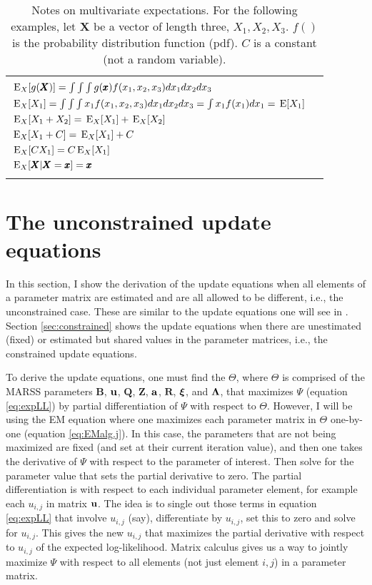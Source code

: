 \documentclass[]{article}
\def\xixi{\mbox{\boldmath $\xi$}}
\def\LAM{\mbox{\boldmath $\Lambda$}}
\def\ZZ{\mbox{$\mathbf Z$}}	\def\zz{\mbox{$\mathbf z$}}
\def\BB{\mbox{$\mathbf B$}}	\def\bb{\mbox{$\mathbf b$}}
\def\QQ{\mbox{$\mathbf Q$}}	 \def\qq{\mbox{$\mathbf q$}}
\def\RR{\mbox{$\mathbf R$}}	 \def\rr{\mbox{$\mathbf r$}}
\def\XX{\mbox{$\pmb{X}$}}	\def\xx{\mbox{$\pmb{x}$}}
\def\E{\,\textup{\textrm{E}}}
\begin{document}
\begin{table}
	\caption{Notes on multivariate expectations.  For the following examples, let $\XX$ be a vector of length three, $X_1,X_2,X_3$. $f()$ is the probability distribution function (pdf). $C$ is a constant (not a random variable).}
	\label{tab:MultivariateExpectations}
\begin{center}\begin{tabular}{lr}
\hline\\
$\E_X[g(\XX)]=\int{\int{\int{g(\xx)f(x_1,x_2,x_3) dx_1 dx_2 dx_3}}}$\\
$\E_X[X_1]=\int{\int{\int{x_1 f(x_1,x_2,x_3) dx_1 dx_2 dx_3}}}=\int{x_1 f(x_1) dx_1}=\E[X_1]$ \\
$\E_X[X_1+X_2]=\E_X[X_1]+\E_X[X_2]$\\
$\E_X[X_1+C]=\E_X[X_1]+C$\\
$\E_X[C X_1]=C\E_X[X_1]$\\
$\E_X[\XX|\XX=\xx]=\xx$ \\
\\
\hline
\end{tabular}
\end{center}
\end{table}

\section{The unconstrained update equations}\label{sec:generalupdate}
In this section, I show the derivation of the update equations when all elements of a parameter matrix are estimated and are all allowed to be different, i.e., the unconstrained case. These are similar to the update equations one will see in \citet{ShumwayStoffer2006}.  Section \ref{sec:constrained} shows the update equations when there are unestimated (fixed) or estimated but shared values in the parameter matrices, i.e., the constrained update equations.   

To derive the update equations, one must find the $\Theta$, where $\Theta$ is comprised of the MARSS parameters $\BB$, $\uu$, $\QQ$, $\ZZ$, $\aa$, $\RR$, $\xixi$, and $\LAM$,  that maximizes $\Psi$ (equation \ref{eq:expLL}) by partial differentiation of $\Psi$  with respect to $\Theta$.  However, I will be using the EM equation where one maximizes each parameter matrix in $\Theta$ one-by-one (equation \ref{eq:EMalg.j}).  In this case, the parameters that are not being maximized are fixed (and set at their current iteration value), and then one takes the derivative of $\Psi$ with respect to the parameter of interest.  Then solve for the parameter value that sets the partial derivative to zero.  The partial differentiation is with respect to each individual parameter element, for example each $u_{i,j}$ in matrix $\uu$. The idea is to single out those terms in equation \ref{eq:expLL} that involve $u_{i,j}$ (say), differentiate by $u_{i,j}$, set this to zero and solve for $u_{i,j}$.  This gives the new $u_{i,j}$ that maximizes the partial derivative with respect to $u_{i,j}$ of the expected log-likelihood.  Matrix calculus gives us a way to jointly maximize $\Psi$ with respect to all elements (not just element $i,j$) in a parameter matrix.
\end{document}
